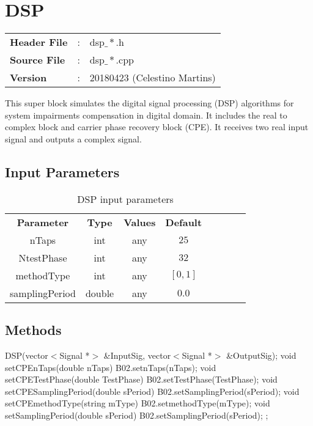 \clearpage

\section{DSP}

\begin{tcolorbox}	
	\begin{tabular}{p{2.75cm} p{0.2cm} p{10.5cm}} 	
		\textbf{Header File}   &:& dsp$\_*$.h \\
		\textbf{Source File}   &:& dsp$\_*$.cpp \\
        \textbf{Version}       &:& 20180423 (Celestino Martins) \\
	\end{tabular}
\end{tcolorbox}

This super block simulates the digital signal processing (DSP) algorithms for system impairments compensation in digital domain. It includes the real to complex block and carrier phase recovery block (CPE). It receives two real input signal and outputs a complex signal.

\subsection*{Input Parameters}

\begin{table}[h]
	\centering
	\begin{tabular}{|c|c|c|c|cccc}
		\cline{1-4}
		\textbf{Parameter} & \textbf{Type} & \textbf{Values} &   \textbf{Default}& \\ \cline{1-4}
		nTaps              & int & any & $25$ \\ \cline{1-4}
        NtestPhase         & int & any & $32$ \\ \cline{1-4}
        methodType         & int & any & $[0,1]$ \\ \cline{1-4}
		samplingPeriod     & double & any & $0.0$ \\ \cline{1-4}	
	\end{tabular}
	\caption{DSP input parameters}
	\label{table:dsp_in_par}
\end{table}

\subsection*{Methods}

DSP(vector$<$Signal *$>$ \&InputSig, vector$<$Signal *$>$ \&OutputSig);
\bigbreak
void setCPEnTaps(double nTaps) { B02.setnTaps(nTaps); }
\bigbreak
void setCPETestPhase(double TestPhase) { B02.setTestPhase(TestPhase); }
\bigbreak
void setCPESamplingPeriod(double sPeriod) { B02.setSamplingPeriod(sPeriod); }
\bigbreak
void setCPEmethodType(string mType) { B02.setmethodType(mType); }
\bigbreak
void setSamplingPeriod(double sPeriod) { B02.setSamplingPeriod(sPeriod); };

